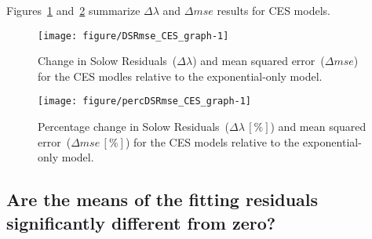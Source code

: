\documentclass[preprint,authoryear,12pt]{elsarticle}\usepackage[]{graphicx}\usepackage[]{color}
\makeatletter
\def\maxwidth{ %
  \ifdim\Gin@nat@width>\linewidth
    \linewidth
  \else
    \Gin@nat@width
  \fi
}
\newenvironment{knitrout}{}{} %
\makeatother
\begin{document}
Figures~\ref{fig:DSRmse_CES_graph} and~\ref{fig:percDSRmse_CES_graph} summarize 
$\Delta \lambda$ and $\Delta mse$ 
results for CES models.
%
\begin{knitrout}
\color{fgcolor}\begin{figure}[H]

{\centering \texttt{[image: figure/DSRmse\_CES\_graph-1]} 

}

\caption[Change in Solow Residuals~(]{Change in Solow Residuals~($\Delta\lambda$) and mean squared error~($\Delta mse$) for the CES modles relative to the exponential-only model.}\label{fig:DSRmse_CES_graph}
\end{figure}


\end{knitrout}
%
\begin{knitrout}
\color{fgcolor}\begin{figure}[H]

{\centering \texttt{[image: figure/percDSRmse\_CES\_graph-1]} 

}

\caption[Percentage change in Solow Residuals~(]{Percentage change in Solow Residuals~($\Delta\lambda \, [\%]$) and mean squared error~($\Delta mse \, [\%]$) for the CES models relative to the exponential-only model.}\label{fig:percDSRmse_CES_graph}
\end{figure}


\end{knitrout}


\subsection{Are the means of the fitting residuals 
            significantly different from zero?} 
\label{sec:fitting_residuals_different_from_zero}
\end{document}

